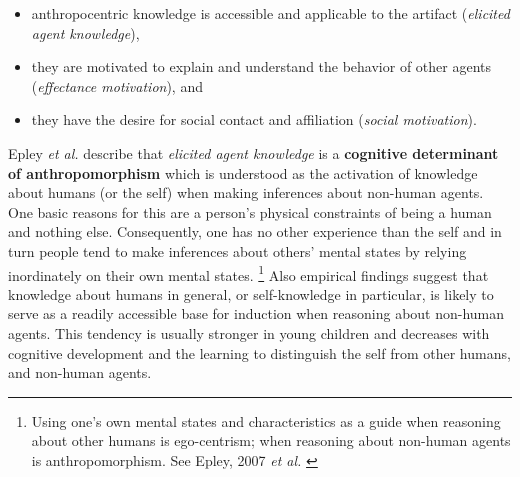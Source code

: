 \documentclass[lettersize, apacite, twoside, HRI]{apa_HRI}
\begin{document}
\begin{itemize}
	\item anthropocentric knowledge is accessible and applicable to the artifact (\textit{elicited agent knowledge}),
	\item they are motivated to explain and understand the behavior of other agents (\textit{effectance motivation}), and
	\item they have the desire for social contact and affiliation (\textit{social motivation}).
\end{itemize}

	Epley \textit{et al.} describe that \textit{elicited agent knowledge} is a \textbf{cognitive determinant  of anthropomorphism} which is understood as the activation of knowledge about humans (or the self) when making inferences about non-human agents. One basic reasons for this are a person's physical constraints of being a human and nothing else. Consequently, one has no other experience than the self and in turn people tend to make inferences about others' mental states by relying inordinately on their own mental states. \footnote{Using one's own mental states and characteristics as a guide when reasoning about other humans is ego-centrism; when reasoning about non-human agents is anthropomorphism. See Epley, 2007 \textit{et al.} \cite{epley_seeing_2007}} Also empirical findings suggest that knowledge about humans in general, or self-knowledge in particular, is likely to serve as a readily accessible base for induction when reasoning about non-human agents. This tendency is usually stronger in young children and decreases with cognitive development and the learning to distinguish the self from other humans, and non-human agents. 
	
\end{document}
